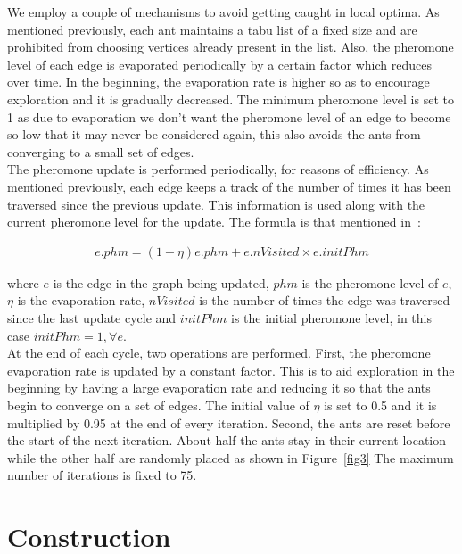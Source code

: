 \begin{spacing}{1.5}
\indent We employ a couple of mechanisms to avoid getting caught in local optima. As mentioned previously, each ant maintains a tabu list of a fixed size and are prohibited from choosing vertices already present in the list. Also, the pheromone level of each edge is evaporated periodically by a certain factor which reduces over time. In the beginning, the evaporation rate is higher so as to encourage exploration and it is gradually decreased. The minimum pheromone level is set to 1 as due to evaporation we don't want the pheromone level of an edge to become so low that it may never be considered again, this also avoids the ants from converging to a small set of edges.\\
\indent The pheromone update is performed periodically, for reasons of efficiency. As mentioned previously, each edge keeps a track of the number of times it has been traversed since the previous update. This information is used along with the current pheromone level for the update. The formula is that mentioned in~\cite{5910378}:

\begin{align}
e.phm = (1 - \eta)e.phm + e.nVisited \times e.initPhm
\end{align}

where $e$ is the edge in the graph being updated, $phm$ is the pheromone level of $e$, $\eta$ is the evaporation rate, $nVisited$ is the number of times the edge was traversed since the last update cycle and $initPhm$ is the initial pheromone level, in this case $initPhm = 1, \forall e$.\\
\indent At the end of each cycle, two operations are performed. First, the pheromone evaporation rate is updated by a constant factor. This is to aid exploration in the beginning by having a large evaporation rate and reducing it so that the ants begin to converge on a set of edges. The initial value of $\eta$ is set to 0.5 and it is multiplied by 0.95 at the end of every iteration. Second, the ants are reset before the start of the next iteration. About half the ants stay in their current location while the other half are randomly placed as shown in Figure~\ref{fig3} The maximum number of iterations is fixed to 75.


\section{Construction}


\end{spacing}
